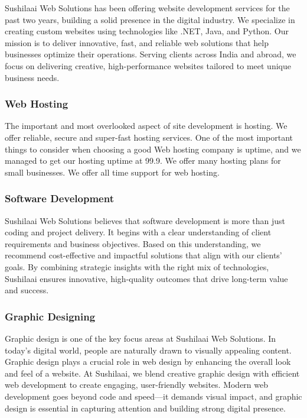 Sushilaai Web Solutions has been offering website development services for the past two years, building a solid presence in the digital industry. We specialize in creating custom websites using technologies like .NET, Java, and Python. Our mission is to deliver innovative, fast, and reliable web solutions that help businesses optimize their operations. Serving clients across India and abroad, we focus on delivering creative, high-performance websites tailored to meet unique business needs.



\subsubsection{Web Hosting }
The important and most overlooked aspect of site development is hosting. We offer reliable, secure
and super-fast hosting services. One of the most important things to consider when choosing a
good Web hosting company is uptime, and we managed to get our hosting uptime at 99.9. We
offer many hosting plans for small businesses. We offer all time support for web hosting.


\subsubsection{Software Development }
Sushilaai Web Solutions believes that software development is more than just coding and project delivery. It begins with a clear understanding of client requirements and business objectives. Based on this understanding, we recommend cost-effective and impactful solutions that align with our clients' goals. By combining strategic insights with the right mix of technologies, Sushilaai ensures innovative, high-quality outcomes that drive long-term value and success.


\subsubsection{Graphic Designing }
Graphic design is one of the key focus areas at Sushilaai Web Solutions. In today’s digital world, people are naturally drawn to visually appealing content. Graphic design plays a crucial role in web design by enhancing the overall look and feel of a website. At Sushilaai, we blend creative graphic design with efficient web development to create engaging, user-friendly websites. Modern web development goes beyond code and speed—it demands visual impact, and graphic design is essential in capturing attention and building strong digital presence.



